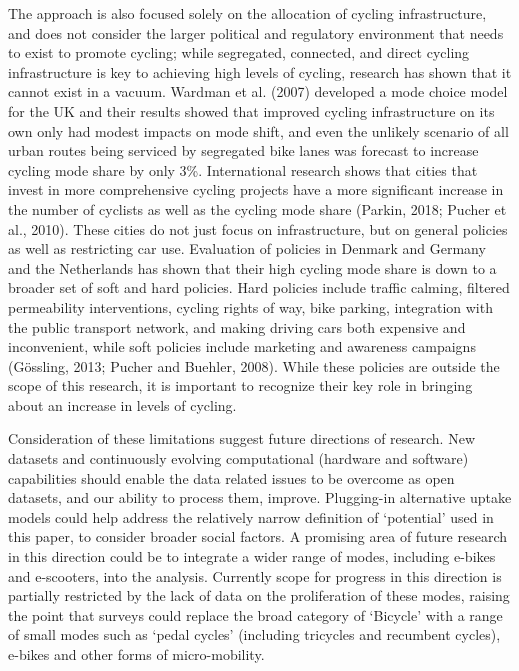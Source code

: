 \documentclass[
]{article}
\begin{document}
The approach is also focused solely on the allocation of cycling
infrastructure, and does not consider the larger political and
regulatory environment that needs to exist to promote cycling; while
segregated, connected, and direct cycling infrastructure is key to
achieving high levels of cycling, research has shown that it cannot
exist in a vacuum. Wardman et al. (2007) developed a mode choice model
for the UK and their results showed that improved cycling infrastructure
on its own only had modest impacts on mode shift, and even the unlikely
scenario of all urban routes being serviced by segregated bike lanes was
forecast to increase cycling mode share by only 3\%. International
research shows that cities that invest in more comprehensive cycling
projects have a more significant increase in the number of cyclists as
well as the cycling mode share (Parkin, 2018; Pucher et al., 2010). These cities do not just focus on
infrastructure, but on general policies as well as restricting car use.
Evaluation of policies in Denmark and Germany and the Netherlands has
shown that their high cycling mode share is down to a broader set of
soft and hard policies. Hard policies include traffic calming, filtered permeability
interventions, cycling rights of way, bike parking, integration with the
public transport network, and making driving cars both expensive and
inconvenient, while soft policies include marketing and awareness campaigns (Gössling, 2013; Pucher and Buehler, 2008). While these policies are outside the scope of this research, it is important to recognize their key role in
bringing about an increase in levels of cycling.

Consideration of these limitations suggest future directions of research.
New datasets and continuously evolving computational (hardware and software)
capabilities should enable the data related issues to be overcome as open
datasets, and our ability to process them, improve.
Plugging-in alternative uptake models could help address the relatively narrow
definition of `potential' used in this paper, to consider broader social factors.
A promising area of future research in this direction could be
to integrate a wider range of modes, including e-bikes and e-scooters, into the
analysis. Currently scope for progress in this direction is
partially restricted by the lack of data on the
proliferation of these modes, raising the point that surveys could
replace the broad category of `Bicycle' with a range of small modes such as
`pedal cycles' (including tricycles and recumbent cycles), e-bikes
and other forms of micro-mobility.
\end{document}
